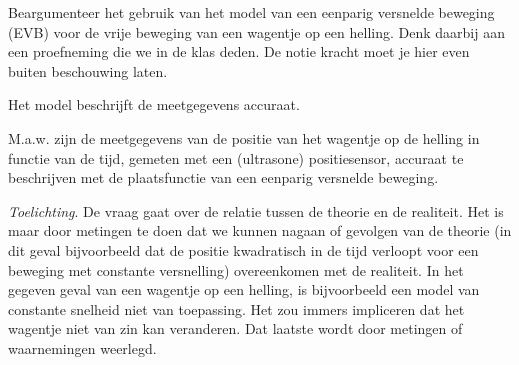 
\begin{exercise}



 Beargumenteer het gebruik van het model van een eenparig versnelde beweging (EVB) voor de vrije beweging van een wagentje op een helling. Denk daarbij aan een proefneming die we in de klas deden. De notie kracht moet je hier even buiten beschouwing laten.

\begin{oplossing}

Het model beschrijft de meetgegevens accuraat.

M.a.w. zijn de meetgegevens van de positie van het wagentje op de helling in functie van de tijd, gemeten met een (ultrasone) positiesensor, accuraat te beschrijven met de plaatsfunctie van een eenparig versnelde beweging.

\emph{Toelichting}.
De vraag gaat over de relatie tussen de theorie en de realiteit. Het is maar door metingen te doen dat we kunnen nagaan of gevolgen van de theorie (in dit geval bijvoorbeeld dat de positie kwadratisch in de tijd verloopt voor een beweging met constante versnelling) overeenkomen met de realiteit. In het gegeven geval van een wagentje op een helling, is bijvoorbeeld een model van constante snelheid niet van toepassing. Het zou immers impliceren dat het wagentje niet van zin kan veranderen. Dat laatste wordt door metingen of waarnemingen weerlegd.

\end{oplossing} 

\end{exercise}
